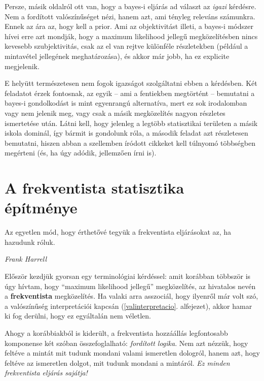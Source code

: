 \documentclass[magyar,]{book}
\begin{document}
Persze, másik oldalról ott van, hogy a bayes-i eljárás ad választ az \emph{igazi} kérdésre. Nem a fordított valószínűséget nézi, hanem azt, ami tényleg releváns számunkra. Ennek az ára az, hogy kell a prior. Ami az objektivitást illeti, a bayes-i módszer hívei erre azt mondják, hogy a maximum likelihood jellegű megközelítésben nincs kevesebb szubjektivitás, csak az el van rejtve különféle részletekben (például a mintavétel jellegének meghatározása), és akkor már jobb, ha ez explicite megjelenik.

E helyütt természetesen nem fogok igazságot szolgáltatni ebben a kérdésben. Két feladatot érzek fontosnak, az egyik -- ami a fentiekben megtörtént -- bemutatni a bayes-i gondolkodást is mint egyenrangú alternatíva, mert ez sok irodalomban vagy nem jelenik meg, vagy csak a másik megközelítés nagyon részletes ismertetése után. Látni kell, hogy jelenleg a legtöbb statisztikai területen a másik iskola dominál, így bármit is gondolunk róla, a második feladat azt részletesen bemutatni, hiszen abban a szellemben íródott cikkeket kell túlnyomó többségben megérteni (és, ha úgy adódik, jellemzően írni is).

\hypertarget{a-frekventista-statisztika-uxe9puxedtmuxe9nye}{%
\section{A frekventista statisztika építménye}\label{a-frekventista-statisztika-uxe9puxedtmuxe9nye}}

\epigraph{Az egyetlen mód, hogy érthetővé tegyük a frekventista eljárásokat az, ha hazudunk róluk.}{\textit{Frank Harrell}}

Először kezdjük gyorsan egy terminológiai kérdéssel: amit korábban többször is úgy hívtam, hogy \enquote{maximum likelihood jellegű} megközelítés, az hivatalos nevén a \textbf{frekventista} megközelítés. Ha valaki arra asszociál, hogy ilyenről már volt szó, a valószínűség interpretációi kapcsán (\ref{valinterpretacio}. alfejezet), akkor hamar ki fog derülni, hogy ez egyáltalán nem véletlen.

Ahogy a korábbiakból is kiderült, a frekventista hozzáállás legfontosabb komponense két szóban összefoglalható: \emph{fordított logika}. Nem azt nézzük, hogy feltéve a mintát mit tudunk mondani valami ismeretlen dologról, hanem azt, hogy feltéve az ismeretlen dolgot, mit tudunk mondani a mintáról. \emph{Ez minden frekventista eljárás sajátja!}
\end{document}
